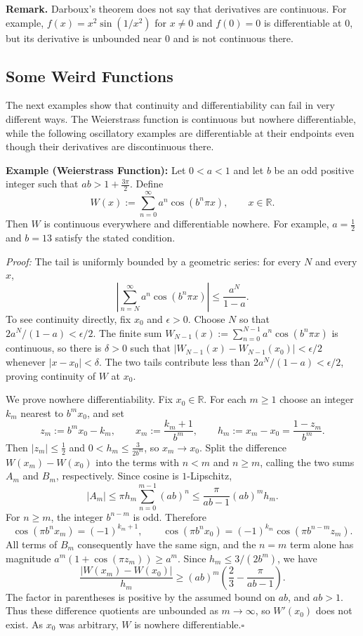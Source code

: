 \documentclass[a4paper,11pt,abstracton]{scrartcl}
\newcommand{\RR}{\mathbb{R}}
\theoremstyle{dotlessP}
\theoremstyle{dotlessS}
\theoremstyle{remark}
\theoremstyle{definition}
\begin{document}
\begin{remark_box}
\textbf{Remark.} Darboux's theorem does not say that derivatives are
continuous. For example, $f(x)=x^2\sin(1/x^2)$ for $x\ne0$ and
$f(0)=0$ is differentiable at $0$, but its derivative is unbounded
near $0$ and is not continuous there.
\end{remark_box}

\subsection{Some Weird Functions}

The next examples show that continuity and differentiability can fail
in very different ways. The Weierstrass function is continuous but
nowhere differentiable, while the following oscillatory examples are
differentiable at their endpoints even though their derivatives are
discontinuous there.

\begin{problem_box}
\textbf{Example (Weierstrass Function):} Let $0<a<1$ and let $b$ be an
odd positive integer such that $ab>1+\frac{3\pi}{2}$. Define
\[
    W(x):=\sum_{n=0}^{\infty}a^n\cos(b^n\pi x),
    \qquad x\in\RR.
\]
Then $W$ is continuous everywhere and differentiable nowhere. For
example, $a=\frac12$ and $b=13$ satisfy the stated condition.
\end{problem_box}

\begin{claim_box}
\textit{Proof:} The tail is uniformly bounded by a geometric series:
for every $N$ and every $x$,
\[
    \left|\sum_{n=N}^{\infty}a^n\cos(b^n\pi x)\right|
    \le\frac{a^N}{1-a}.
\]
To see continuity directly, fix $x_0$ and $\epsilon>0$. Choose $N$ so
that $2a^N/(1-a)<\epsilon/2$. The finite sum
$W_{N-1}(x):=\sum_{n=0}^{N-1}a^n\cos(b^n\pi x)$ is continuous, so
there is $\delta>0$ such that
$|W_{N-1}(x)-W_{N-1}(x_0)|<\epsilon/2$ whenever
$|x-x_0|<\delta$. The two tails contribute less than
$2a^N/(1-a)<\epsilon/2$, proving continuity of $W$ at $x_0$.

We prove nowhere differentiability. Fix $x_0\in\RR$. For each $m\ge1$
choose an integer $k_m$ nearest to $b^m x_0$, and set
\[
    z_m:=b^m x_0-k_m,\qquad
    x_m:=\frac{k_m+1}{b^m},\qquad
    h_m:=x_m-x_0=\frac{1-z_m}{b^m}.
\]
Then $|z_m|\le\frac12$ and $0<h_m\le\frac{3}{2b^m}$, so
$x_m\to x_0$. Split the difference $W(x_m)-W(x_0)$ into the terms
with $n<m$ and $n\ge m$, calling the two sums $A_m$ and $B_m$,
respectively. Since cosine is $1$-Lipschitz,
\[
    |A_m|
    \le \pi h_m\sum_{n=0}^{m-1}(ab)^n
    \le \frac{\pi}{ab-1}(ab)^m h_m.
\]
For $n\ge m$, the integer $b^{n-m}$ is odd. Therefore
\[
\cos(\pi b^n x_m)=(-1)^{k_m+1},\qquad
\cos(\pi b^n x_0)=(-1)^{k_m}\cos(\pi b^{n-m}z_m).
\]
All terms of $B_m$ consequently have the same sign, and the $n=m$
term alone has magnitude
$a^m(1+\cos(\pi z_m))\ge a^m$. Since
$h_m\le3/(2b^m)$, we have
\[
\frac{|W(x_m)-W(x_0)|}{h_m}
\ge (ab)^m\left(\frac23-\frac{\pi}{ab-1}\right).
\]
The factor in parentheses is positive by the assumed bound on $ab$,
and $ab>1$. Thus these difference quotients are unbounded as
$m\to\infty$, so $W'(x_0)$ does not exist. As $x_0$ was arbitrary,
$W$ is nowhere differentiable.\hfill$\square$
\end{claim_box}
\end{document}
